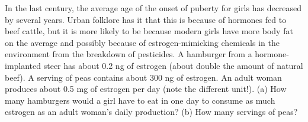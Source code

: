  In the last century, the average age of the onset of
puberty for girls has decreased by several years. Urban
folklore has it that this is because of hormones fed to beef
cattle, but it is more likely to be because modern girls
have more body fat on the average and possibly because of
estrogen-mimicking chemicals in the environment from the
breakdown of pesticides. A hamburger from a hormone-implanted
steer has about 0.2 ng of estrogen (about double the amount
of natural beef). A serving of peas contains about 300 ng of
estrogen. An adult woman produces about 0.5 mg of estrogen
per day (note the different unit!). (a) How many hamburgers
would a girl have to eat in one day to consume as much
estrogen as an adult woman's daily production? (b) How
many servings of peas? \answercheck\hwendpart
